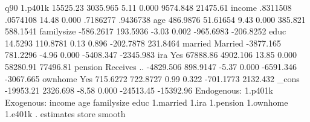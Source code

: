 q90          {\VBAR}
     1.p401k {\VBAR}   15525.23   3035.965     5.11   0.000     9574.848    21475.61
      income {\VBAR}   .8311508   .0574108    14.48   0.000     .7186277    .9436738
         age {\VBAR}   486.9876   51.61654     9.43   0.000      385.821    588.1541
  familysize {\VBAR}  -586.2617   193.5936    -3.03   0.002    -965.6983   -206.8252
        educ {\VBAR}    14.5293   110.8781     0.13   0.896    -202.7878    231.8464
             {\VBAR}
     married {\VBAR}
    Married  {\VBAR}  -3877.165   781.2296    -4.96   0.000    -5408.347   -2345.983
             {\VBAR}
         ira {\VBAR}
        Yes  {\VBAR}   67888.86   4902.106    13.85   0.000     58280.91    77496.81
             {\VBAR}
     pension {\VBAR}
Receives ..  {\VBAR}  -4829.506   898.9147    -5.37   0.000    -6591.346   -3067.665
             {\VBAR}
     ownhome {\VBAR}
        Yes  {\VBAR}   715.6272   722.8727     0.99   0.322    -701.1773    2132.432
       _cons {\VBAR}  -19953.21   2326.698    -8.58   0.000    -24513.45   -15392.96
Endogenous: 1.p401k
Exogenous:  income age familysize educ 1.married 1.ira 1.pension 1.ownhome
            1.e401k
{\smallskip}
. estimates  store smooth

